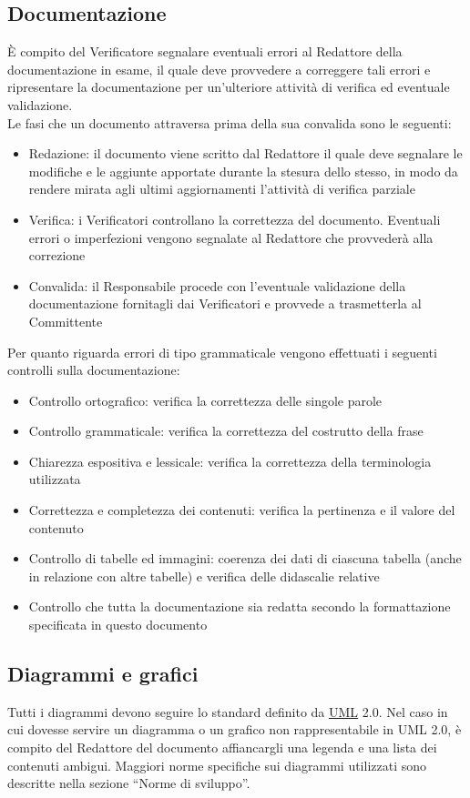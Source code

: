 \documentclass[a4paper,11pt]{article}
\begin{document}
\subsection{Documentazione}
 \`E compito del Verificatore segnalare eventuali errori al Redattore della documentazione in esame, il quale deve provvedere a correggere tali errori e ripresentare la documentazione per un'ulteriore attivit\`a di verifica ed eventuale validazione.
\\
Le fasi che un documento attraversa prima della sua convalida sono le seguenti:
\begin{itemize}
\item Redazione: il documento viene scritto dal Redattore il quale deve segnalare le modifiche e le aggiunte apportate durante la stesura dello stesso, in modo da rendere mirata agli ultimi aggiornamenti l'attivit\`a di verifica parziale
\item Verifica: i Verificatori controllano la correttezza del documento. Eventuali errori o imperfezioni vengono segnalate al Redattore che provveder\`a alla correzione
\item Convalida: il Responsabile procede con l'eventuale validazione della documentazione fornitagli dai Verificatori e provvede a trasmetterla al Committente
\end{itemize}
Per quanto riguarda errori di tipo grammaticale vengono effettuati i seguenti controlli sulla documentazione:
\begin{itemize}
\item Controllo ortografico: verifica la correttezza delle singole parole
\item Controllo grammaticale: verifica la correttezza del costrutto della frase
\item Chiarezza espositiva e lessicale: verifica la correttezza della terminologia utilizzata
\item Correttezza e completezza dei contenuti: verifica la pertinenza e il valore del contenuto
\item Controllo di tabelle ed immagini: coerenza dei dati di ciascuna tabella (anche in relazione con altre tabelle) e verifica delle didascalie relative
\item Controllo che tutta la documentazione sia redatta secondo la formattazione specificata in questo documento 
\end{itemize}

\subsection{Diagrammi e grafici}
Tutti i diagrammi devono seguire lo standard definito da \underline{UML} 2.0. Nel caso in cui dovesse servire un diagramma o un grafico non rappresentabile in UML 2.0, \`e compito del Redattore del documento affiancargli una legenda e una lista dei contenuti ambigui. Maggiori norme specifiche sui diagrammi utilizzati sono descritte nella sezione ``Norme di sviluppo''.
\end{document}
